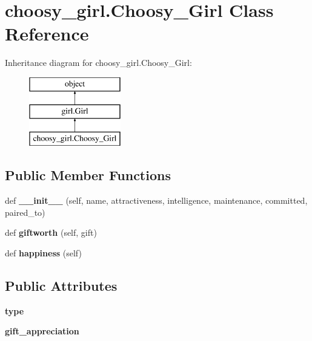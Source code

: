 \hypertarget{classchoosy__girl_1_1_choosy___girl}{}\section{choosy\+\_\+girl.\+Choosy\+\_\+\+Girl Class Reference}
\label{classchoosy__girl_1_1_choosy___girl}
Inheritance diagram for choosy\+\_\+girl.\+Choosy\+\_\+\+Girl\+:\begin{figure}[H]
\begin{center}
\leavevmode
\includegraphics[height=3.000000cm]{classchoosy__girl_1_1_choosy___girl}
\end{center}
\end{figure}
\subsection*{Public Member Functions}
\begin{DoxyCompactItemize}
\item 
\mbox{\label{classchoosy__girl_1_1_choosy___girl_af359f24e40dd32cd42b4e556957c4398}} 
def {\bfseries \+\_\+\+\_\+init\+\_\+\+\_\+} (self, name, attractiveness, intelligence, maintenance, committed, paired\+\_\+to)
\item 
\mbox{\label{classchoosy__girl_1_1_choosy___girl_a0ca3f882f7db874f3d9a8910e1200610}} 
def {\bfseries giftworth} (self, gift)
\item 
\mbox{\label{classchoosy__girl_1_1_choosy___girl_a02611ddf51ba90e2d483ba3895258b5d}} 
def {\bfseries happiness} (self)
\end{DoxyCompactItemize}
\subsection*{Public Attributes}
\begin{DoxyCompactItemize}
\item 
\mbox{\label{classchoosy__girl_1_1_choosy___girl_aa1ed305e2c8a9cec5b7c803dbac497af}} 
{\bfseries type}
\item 
\mbox{\label{classchoosy__girl_1_1_choosy___girl_ae997ec53e67e4529d3dba9f3d57fd523}} 
{\bfseries gift\+\_\+appreciation}
\end{DoxyCompactItemize}


